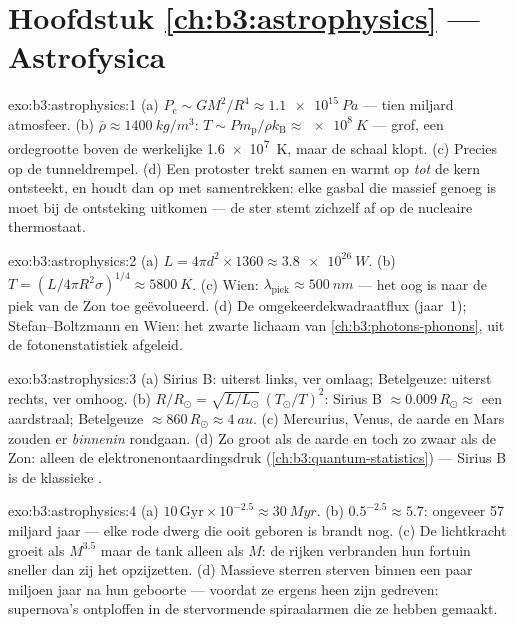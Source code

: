 \section*{Hoofdstuk \ref{ch:b3:astrophysics} --- Astrofysica}

\begin{solution}{exo:b3:astrophysics:1}
(a) $P_{\text{c}} \sim GM^2/R^4 \approx \qty{1.1e15}{Pa}$ --- tien
miljard atmosfeer. (b) $\bar\rho \approx \qty{1400}{kg/m^3}$:
$T \sim P m_{\text{p}}/\rho k_{\text{B}} \approx \qty{e8}{K}$ ---
grof, een ordegrootte boven de werkelijke \qty{1.6e7}{K}, maar de schaal
klopt. (c) Precies op de tunneldrempel. (d) Een protoster
trekt samen en warmt op \emph{tot} de kern ontsteekt, en houdt dan op met
samentrekken: elke gasbal die massief genoeg is moet bij de ontsteking uitkomen
--- de ster stemt zichzelf af op de nucleaire thermostaat.
\end{solution}

\begin{solution}{exo:b3:astrophysics:2}
(a) $L = 4\pi d^2\times1360 \approx \qty{3.8e26}{W}$. (b) $T =
(L/4\pi R^2\sigma)^{1/4} \approx \qty{5800}{K}$. (c) Wien:
$\lambda_{\text{piek}} \approx \qty{500}{nm}$ --- het oog is naar de
piek van de Zon toe geëvolueerd. (d) De omgekeerdekwadraatflux (jaar~1);
Stefan--Boltzmann en Wien: het zwarte lichaam van
\cref{ch:b3:photons-phonons}, uit de fotonenstatistiek afgeleid.
\end{solution}

\begin{solution}{exo:b3:astrophysics:3}
(a) Sirius B: uiterst links, ver omlaag; Betelgeuze: uiterst rechts, ver omhoog.
(b) $R/R_\odot = \sqrt{L/L_\odot}\,(T_\odot/T)^2$: Sirius B
$\approx 0.009\,R_\odot \approx$ een aardstraal; Betelgeuze
$\approx 860\,R_\odot \approx \qty{4}{au}$. (c) Mercurius, Venus,
de aarde en Mars zouden er \emph{binnenin} rondgaan. (d) Zo groot als de aarde en toch
zo zwaar als de Zon: alleen de elektronenontaardingsdruk
(\cref{ch:b3:quantum-statistics}) --- Sirius B is de klassieke
.
\end{solution}

\begin{solution}{exo:b3:astrophysics:4}
(a) $10\,\text{Gyr}\times10^{-2.5} \approx \qty{30}{Myr}$. (b)
$0.5^{-2.5} \approx 5.7$: ongeveer 57 miljard jaar --- elke rode
dwerg die ooit geboren is brandt nog. (c) De lichtkracht groeit als
$M^{3.5}$ maar de tank alleen als $M$: de rijken verbranden hun fortuin
sneller dan zij het opzijzetten. (d) Massieve sterren sterven binnen een paar
miljoen jaar na hun geboorte --- voordat ze ergens heen zijn gedreven: supernova's
ontploffen in de stervormende spiraalarmen die ze hebben gemaakt.
\end{solution}

